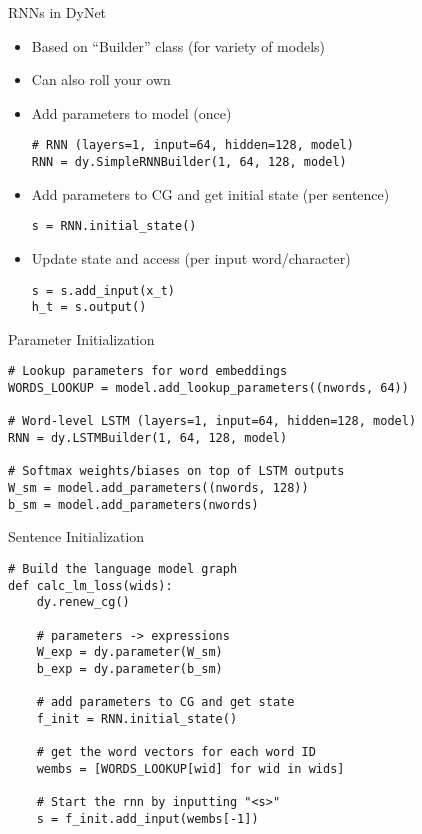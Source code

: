 \documentclass[compress]{beamer}
\begin{document}
\begin{frame}[fragile]{RNNs in DyNet}

\begin{itemize}
\item Based on ``Builder'' class (for variety of models)
  \item Can also roll your own
    \item Add parameters to model (once)
\begin{verbatim}
# RNN (layers=1, input=64, hidden=128, model)
RNN = dy.SimpleRNNBuilder(1, 64, 128, model)
\end{verbatim}
      \item Add parameters to CG and get initial state (per sentence)
\begin{verbatim}
s = RNN.initial_state()
\end{verbatim}
        \item Update state and access (per input word/character)
\begin{verbatim}
s = s.add_input(x_t)
h_t = s.output()
\end{verbatim}
\end{itemize}

\end{frame}

\begin{frame}[fragile]{Parameter Initialization}

\begin{verbatim}
# Lookup parameters for word embeddings
WORDS_LOOKUP = model.add_lookup_parameters((nwords, 64))

# Word-level LSTM (layers=1, input=64, hidden=128, model)
RNN = dy.LSTMBuilder(1, 64, 128, model)

# Softmax weights/biases on top of LSTM outputs
W_sm = model.add_parameters((nwords, 128))
b_sm = model.add_parameters(nwords)
\end{verbatim}

\end{frame}


\begin{frame}[fragile]{Sentence Initialization}

\begin{verbatim}
# Build the language model graph
def calc_lm_loss(wids):
    dy.renew_cg()

    # parameters -> expressions
    W_exp = dy.parameter(W_sm)
    b_exp = dy.parameter(b_sm)

    # add parameters to CG and get state
    f_init = RNN.initial_state()

    # get the word vectors for each word ID
    wembs = [WORDS_LOOKUP[wid] for wid in wids]

    # Start the rnn by inputting "<s>"
    s = f_init.add_input(wembs[-1])
\end{verbatim}

\end{frame}
\end{document}
